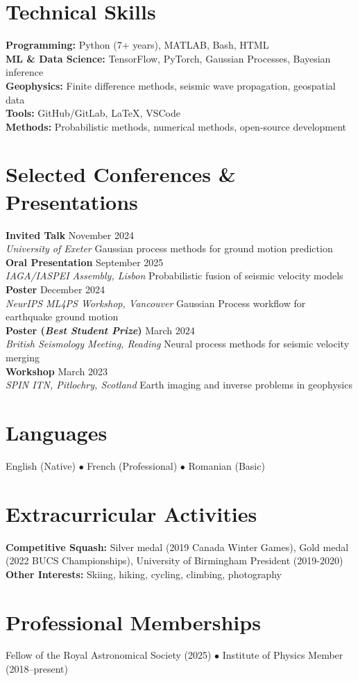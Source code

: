 \documentclass[11pt,a4paper]{article}
\newcommand{\cventry}[4]{%
    \noindent\textbf{#1} \hfill #2\\
    \textit{#3} \hfill #4\\[0.3em]
}
\begin{document}
\section*{Technical Skills}
\textbf{Programming:} Python (7+ years), MATLAB, Bash, HTML \\
\textbf{ML \& Data Science:} TensorFlow, PyTorch, Gaussian Processes, Bayesian inference \\
\textbf{Geophysics:} Finite difference methods, seismic wave propagation, geospatial data \\
\textbf{Tools:} GitHub/GitLab, LaTeX, VSCode \\
\textbf{Methods:} Probabilistic methods, numerical methods, open-source development

\section*{Selected Conferences \& Presentations}
\cventry{Invited Talk}{November 2024}{University of Exeter}{Gaussian process methods for ground motion prediction}

\cventry{Oral Presentation}{September 2025}{IAGA/IASPEI Assembly, Lisbon}{Probabilistic fusion of seismic velocity models}

\cventry{Poster}{December 2024}{NeurIPS ML4PS Workshop, Vancouver}{Gaussian Process workflow for earthquake ground motion}

\cventry{Poster (\textit{Best Student Prize})}{March 2024}{British Seismology Meeting, Reading}{Neural process methods for seismic velocity merging}

\cventry{Workshop}{March 2023}{SPIN ITN, Pitlochry, Scotland}{Earth imaging and inverse problems in geophysics}

\section*{Languages}
English (Native) $\bullet$ French (Professional) $\bullet$ Romanian (Basic)

\section*{Extracurricular Activities}
\textbf{Competitive Squash:} Silver medal (2019 Canada Winter Games), Gold medal (2022 BUCS Championships), University of Birmingham President (2019-2020) \\
\textbf{Other Interests:} Skiing, hiking, cycling, climbing, photography

\section*{Professional Memberships}
Fellow of the Royal Astronomical Society (2025) $\bullet$ Institute of Physics Member (2018--present)
\end{document}
